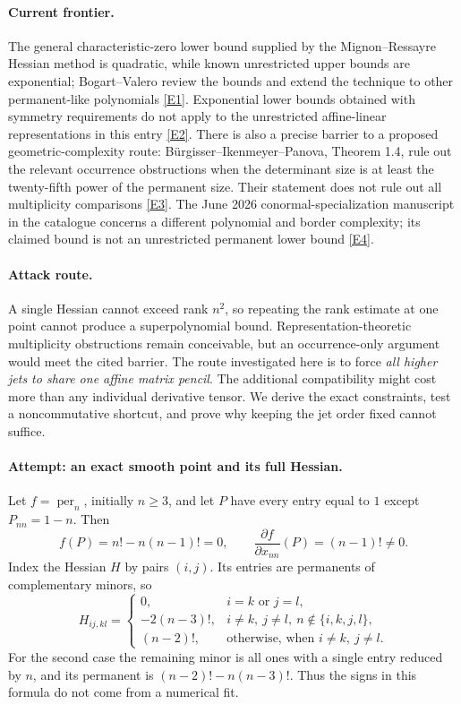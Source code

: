 \documentclass[11pt,a4paper]{article}
\newcommand{\eref}[2]{\hyperlink{extra:#1:#2}{[E#2]}}
\numberwithin{equation}{section}
\begin{document}
\paragraph{Current frontier.}
The general characteristic-zero lower bound supplied by the Mignon--Ressayre Hessian method is quadratic, while known unrestricted upper bounds are exponential; Bogart--Valero review the bounds and extend the technique to other permanent-like polynomials \eref{statement}{1}. Exponential lower bounds obtained with symmetry requirements do not apply to the unrestricted affine-linear representations in this entry \eref{statement}{2}. There is also a precise barrier to a proposed geometric-complexity route: B\"urgisser--Ikenmeyer--Panova, Theorem 1.4, rule out the relevant occurrence obstructions when the determinant size is at least the twenty-fifth power of the permanent size. Their statement does not rule out all multiplicity comparisons \eref{statement}{3}. The June 2026 conormal-specialization manuscript in the catalogue concerns a different polynomial and border complexity; its claimed bound is not an unrestricted permanent lower bound \eref{statement}{4}.

\paragraph{Attack route.}
A single Hessian cannot exceed rank $n^2$, so repeating the rank estimate at one point cannot produce a superpolynomial bound. Representation-theoretic multiplicity obstructions remain conceivable, but an occurrence-only argument would meet the cited barrier. The route investigated here is to force \emph{all higher jets to share one affine matrix pencil}. The additional compatibility might cost more than any individual derivative tensor. We derive the exact constraints, test a noncommutative shortcut, and prove why keeping the jet order fixed cannot suffice.

\paragraph{Attempt: an exact smooth point and its full Hessian.}
Let $f=\operatorname{per}_n$, initially $n\geq3$, and let $P$ have every entry equal to $1$ except $P_{nn}=1-n$. Then
\[
 f(P)=n!-n(n-1)!=0,
 \qquad \frac{\partial f}{\partial x_{nn}}(P)=(n-1)!\ne0.
\]
Index the Hessian $H$ by pairs $(i,j)$. Its entries are permanents of complementary minors, so
\begin{equation}\label{r57:hessian}
 H_{ij,kl}=\begin{cases}
 0,&i=k\text{ or }j=l,\\
 -2(n-3)!,&i\ne k,\ j\ne l,\ n\notin\{i,k,j,l\},\\
 (n-2)!,&\text{otherwise, when }i\ne k,\ j\ne l.
 \end{cases}
\end{equation}
For the second case the remaining minor is all ones with a single entry reduced by $n$, and its permanent is $(n-2)!-n(n-3)!$. Thus the signs in this formula do not come from a numerical fit.
\end{document}
